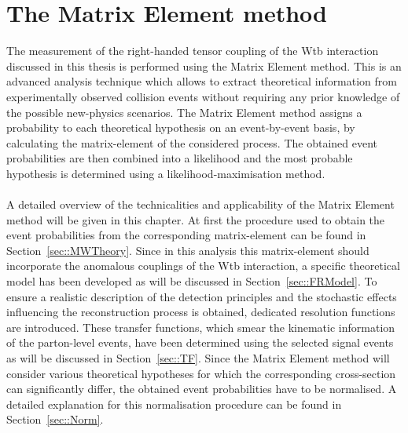 \chapter{The Matrix Element method} \label{ch::MW}

The measurement of the right-handed tensor coupling of the Wtb interaction discussed in this thesis is performed using the Matrix Element method.
This is an advanced analysis technique which allows to extract theoretical information from experimentally observed collision events without requiring any prior knowledge of the possible new-physics scenarios.
The Matrix Element method assigns a probability to each theoretical hypothesis on an event-by-event basis, by calculating the matrix-element of the considered process.
The obtained event probabilities are then combined into a likelihood and the most probable hypothesis is determined using a likelihood-maximisation method.
\\
\\
A detailed overview of the technicalities and applicability of the Matrix Element method will be given in this chapter.
At first the procedure used to obtain the event probabilities from the corresponding matrix-element can be found in Section~\ref{sec::MWTheory}.
Since in this analysis this matrix-element should incorporate the anomalous couplings of the Wtb interaction, a specific theoretical model has been developed as will be discussed in Section~\ref{sec::FRModel}.
To ensure a realistic description of the detection principles and the stochastic effects influencing the reconstruction process is obtained, dedicated resolution functions are introduced. These transfer functions, which smear the kinematic information of the parton-level events, have been determined using the selected signal events as will be discussed in Section~\ref{sec::TF}.
Since the Matrix Element method will consider various theoretical hypotheses for which the corresponding cross-section can significantly differ, the obtained event probabilities have to be normalised. A detailed explanation for this normalisation procedure can be found in Section~\ref{sec::Norm}.
